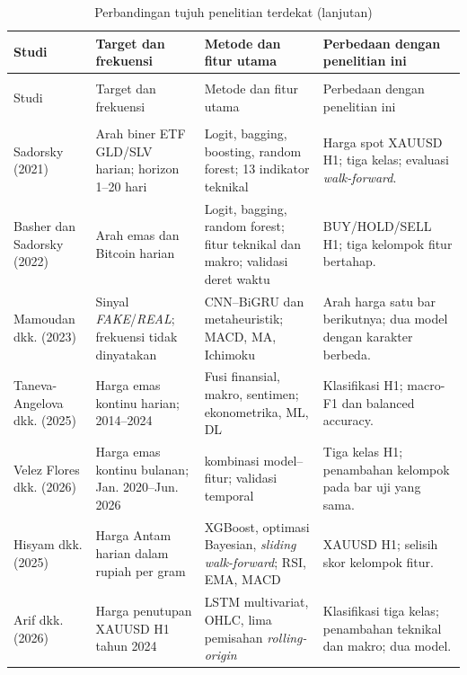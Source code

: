 \begingroup
\setlength{\LTleft}{\fill}
\setlength{\LTright}{\fill}
\setlength{\tabcolsep}{3pt}
\begin{longtable}{>{\raggedright\arraybackslash}p{2.2cm}>{\raggedright\arraybackslash}p{2.8cm}>{\raggedright\arraybackslash}p{3.4cm}>{\raggedright\arraybackslash}p{4.2cm}}
    \caption{Perbandingan tujuh penelitian terdekat}
    \label{tab:studi-terdekat}\\
    \hline
    Studi & Target dan frekuensi & Metode dan fitur utama & Perbedaan dengan penelitian ini \\
    \hline
    \endfirsthead
    \caption[]{Perbandingan tujuh penelitian terdekat (lanjutan)}\\
    \hline
    Studi & Target dan frekuensi & Metode dan fitur utama & Perbedaan dengan penelitian ini \\
    \hline
    \endhead
    \hline
    \multicolumn{4}{r}{Bersambung ke halaman berikutnya}\\
    \endfoot
    \hline
    \endlastfoot
    Sadorsky (2021) & Arah biner ETF GLD/SLV harian; horizon 1--20 hari & Logit, bagging, boosting, random forest; 13 indikator teknikal & Harga spot XAUUSD H1; tiga kelas; evaluasi \emph{walk-forward}. \\
    Basher dan Sadorsky (2022) & Arah emas dan Bitcoin harian & Logit, bagging, random forest; fitur teknikal dan makro; validasi deret waktu & BUY/HOLD/SELL H1; tiga kelompok fitur bertahap. \\
    Mamoudan dkk. (2023) & Sinyal \emph{FAKE}/\emph{REAL}; frekuensi tidak dinyatakan & CNN--BiGRU dan metaheuristik; MACD, MA, Ichimoku & Arah harga satu bar berikutnya; dua model dengan karakter berbeda. \\
    Taneva-Angelova dkk. (2025) & Harga emas kontinu harian; 2014--2024 & Fusi finansial, makro, sentimen; ekonometrika, ML, DL & Klasifikasi H1; macro-F1 dan balanced accuracy. \\
    Velez Flores dkk. (2026) & Harga emas kontinu bulanan; Jan. 2020--Jun. 2026 & 32 kombinasi model--fitur; validasi temporal & Tiga kelas H1; penambahan kelompok pada bar uji yang sama. \\
    Hisyam dkk. (2025) & Harga Antam harian dalam rupiah per gram & XGBoost, optimasi Bayesian, \emph{sliding walk-forward}; RSI, EMA, MACD & XAUUSD H1; selisih skor kelompok fitur. \\
    Arif dkk. (2026) & Harga penutupan XAUUSD H1 tahun 2024 & LSTM multivariat, OHLC, lima pemisahan \emph{rolling-origin} & Klasifikasi tiga kelas; penambahan teknikal dan makro; dua model. \\
\end{longtable}
\endgroup

